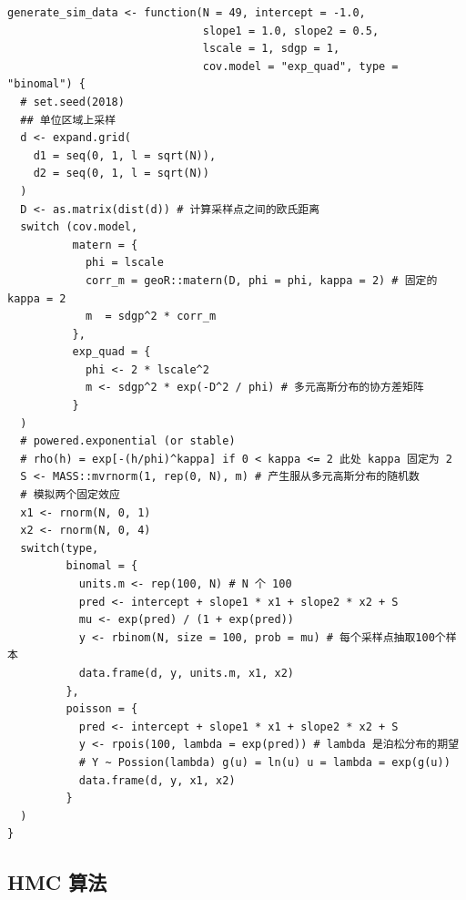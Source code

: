 \documentclass[12pt,a4paper,UTF8,twoside]{book}
\theoremstyle{definition}
\theoremstyle{definition}
\theoremstyle{definition}
\theoremstyle{remark}
\begin{document}
\begin{verbatim}
generate_sim_data <- function(N = 49, intercept = -1.0, 
                              slope1 = 1.0, slope2 = 0.5,
                              lscale = 1, sdgp = 1, 
                              cov.model = "exp_quad", type = "binomal") {
  # set.seed(2018) 
  ## 单位区域上采样
  d <- expand.grid(
    d1 = seq(0, 1, l = sqrt(N)),
    d2 = seq(0, 1, l = sqrt(N))
  )
  D <- as.matrix(dist(d)) # 计算采样点之间的欧氏距离
  switch (cov.model,
          matern = {
            phi = lscale
            corr_m = geoR::matern(D, phi = phi, kappa = 2) # 固定的 kappa = 2 
            m  = sdgp^2 * corr_m 
          },
          exp_quad = {
            phi <- 2 * lscale^2
            m <- sdgp^2 * exp(-D^2 / phi) # 多元高斯分布的协方差矩阵
          }
  )
  # powered.exponential (or stable)
  # rho(h) = exp[-(h/phi)^kappa] if 0 < kappa <= 2 此处 kappa 固定为 2
  S <- MASS::mvrnorm(1, rep(0, N), m) # 产生服从多元高斯分布的随机数
  # 模拟两个固定效应
  x1 <- rnorm(N, 0, 1)
  x2 <- rnorm(N, 0, 4)
  switch(type,
         binomal = {
           units.m <- rep(100, N) # N 个 100
           pred <- intercept + slope1 * x1 + slope2 * x2 + S
           mu <- exp(pred) / (1 + exp(pred))
           y <- rbinom(N, size = 100, prob = mu) # 每个采样点抽取100个样本
           data.frame(d, y, units.m, x1, x2)
         },
         poisson = {
           pred <- intercept + slope1 * x1 + slope2 * x2 + S
           y <- rpois(100, lambda = exp(pred)) # lambda 是泊松分布的期望  
           # Y ~ Possion(lambda) g(u) = ln(u) u = lambda = exp(g(u))
           data.frame(d, y, x1, x2)
         }
  )
}
\end{verbatim}

\hypertarget{HMC-Algrithms}{%
\subsection*{HMC 算法}\label{HMC-Algrithms}}
\end{document}
